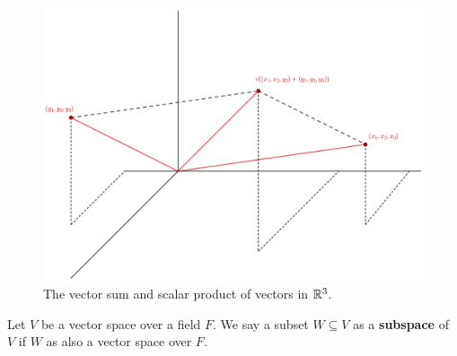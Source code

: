 \begin{figure}
    \centering
    \includegraphics[scale=0.5]{Figures/Chapter2/vectorSumProduct.eps}
    \caption{The vector sum and scalar product of vectors in $\mathbb{R}^3$.}
    \label{fig_2.1}
\end{figure}

\begin{definition}
    Let $V$ be a vector space over a field  $F$. We say a subset  $W \subseteq
    V$ as a \textbf{subspace} of $V$ if  $W$ as also a vector space over $F$.
\end{definition}

